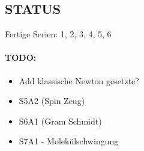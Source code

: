 \documentclass[12pt]{article}
\begin{document}
\maketitle


\subsection*{STATUS}

Fertige Serien: 1, 2, 3, 4, 5, 6

\paragraph{TODO:}
\begin{itemize}
  \item Add klassische Newton gesetzte?
  \item S5A2 (Spin Zeug)
  \item S6A1 (Gram Schmidt)
  \item S7A1 - Molekülschwingung
\end{itemize}

\newpage
\end{document}
